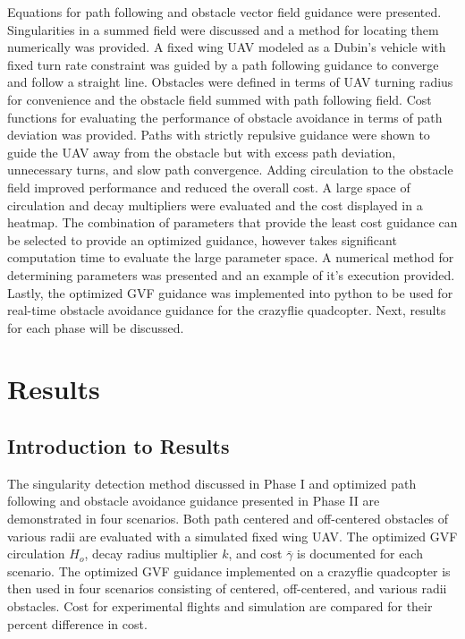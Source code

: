 \documentclass[numbered,pdftex]{ohio-etd}
\begin{document}
Equations for path following and obstacle vector field guidance were presented. Singularities in a summed field were discussed and a method for locating them numerically was provided. A fixed wing UAV modeled as a Dubin's vehicle with fixed turn rate constraint was guided by a path following guidance to converge and follow a straight line. Obstacles were defined in terms of UAV turning radius for convenience and the obstacle field summed with path following field. Cost functions for evaluating the performance of obstacle avoidance in terms of path deviation was provided. Paths with strictly repulsive guidance were shown to guide the UAV away from the obstacle but with excess path deviation, unnecessary turns, and slow path convergence. Adding circulation to the obstacle field improved performance and reduced the overall cost. A large space of circulation and decay multipliers were evaluated and the cost displayed in a heatmap. The combination of parameters that provide the least cost guidance can be selected to provide an optimized guidance, however takes significant computation time to evaluate the large parameter space. A numerical method for determining parameters was presented and an example of it's execution provided. Lastly, the optimized GVF guidance was implemented into python to be used for real-time obstacle avoidance guidance for the crazyflie quadcopter. Next, results for each phase will be discussed. 


\chapter{Results}
\section{Introduction to Results}

The singularity detection method discussed in Phase I and optimized path following and obstacle avoidance guidance presented in Phase II are demonstrated in four scenarios. Both path centered and off-centered obstacles of various radii are evaluated with a simulated fixed wing UAV. The optimized GVF circulation $H_o$, decay radius multiplier $k$, and cost $\bar{\gamma}$ is documented for each scenario. The optimized GVF guidance implemented on a crazyflie quadcopter is then used in four scenarios consisting of centered, off-centered, and various radii obstacles. Cost for experimental flights and simulation are compared for their percent difference in cost.
\end{document}
